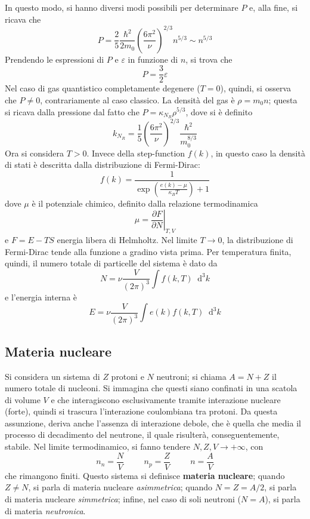 \documentclass[11pt, a4paper]{scrartcl}
\theoremstyle{style}
\newcommand{\dd}{\mathop{}\!\mathrm{d}}
\newcommand*\Eval[3]{\left.#1\right\rvert_{#2}^{#3}}
\numberwithin{equation}{subsection}
\begin{document}
In questo modo, si hanno diversi modi possibili per determinare $P$ e, alla fine, si ricava che
\begin{equation}
	P = \frac{2}{5} \frac{\hbar ^2}{2m_0} \left(\frac{6 \pi ^2}{\nu }\right) ^{2 / 3} n^{5 / 3} \sim n^{5 / 3}
\end{equation}
Prendendo le espressioni di $P$ e $\varepsilon $ in funzione di $n$, si trova che 
\[
P = \frac{3}{2} \varepsilon 
\] 
Nel caso di gas quantistico completamente degenere ($T=0$), quindi, si osserva che $P \neq 0$, contrariamente al caso classico.
La densit\`a del gas \`e $\rho  = m_0n$; questa si ricava dalla pressione dal fatto che $P = \kappa _{N_R}\rho ^{5 / 3}$, dove si \`e definito
\[
k_{N_R} = \frac{1}{5} \left(\frac{6\pi^2}{\nu }\right) ^{ 2 / 3} \frac{\hbar ^2}{m_0^{8 / 3}}
\] 
Ora si considera $T>0$.
Invece della step-function $f(k)$, in questo caso la densit\`a di stati \`e descritta dalla distribuzione di Fermi-Dirac: 
\[
f(k) = \frac{1}{\exp\left(\frac{e(k) - \mu }{\kappa _BT}\right) +1}
\] 
dove $\mu $ \`e il potenziale chimico, definito dalla relazione termodinamica
\[
	\mu  = \Eval{\frac{\partial F}{\partial N}}{T,V}{} 
\] 
e $F= E - TS$ energia libera di Helmholtz.
Nel limite $T\to 0$, la distribuzione di Fermi-Dirac tende alla funzione a gradino vista prima.
Per temperatura finita, quindi, il numero totale di particelle del sistema \`e dato da 
\[
N = \nu  \frac{V}{(2\pi)^3} \int f(k,T) \dd ^3 k
\] 
e l'energia interna \`e 
\[
E = \nu  \frac{V}{(2\pi)^3} \int e(k) f(k,T) \dd ^3 k 
\] 

\subsection{Materia nucleare}

Si considera un sistema di $Z$ protoni e $N$ neutroni; si chiama $A = N + Z$ il numero totale di nucleoni.
Si immagina che questi siano confinati in una scatola di volume $V$ e che interagiscono esclusivamente tramite interazione nucleare (forte), quindi si trascura l'interazione coulombiana tra protoni.
Da questa assunzione, deriva anche l'assenza di interazione debole, che \`e quella che media il processo di decadimento del neutrone, il quale risulter\`a, conseguentemente, stabile.
Nel limite termodinamico, si fanno tendere $N,Z,V\to +\infty$, con 
\[
n_n = \frac{N}{V} \hspace{1cm} n_p = \frac{Z}{V} \hspace{1cm} n = \frac{A}{V}
\] 
che rimangono finiti.
Questo sistema si definisce \textbf{materia nucleare}; quando $Z\neq N$, si parla di materia nucleare \textit{asimmetrica}; quando $N = Z = A / 2$, si parla di materia nucleare \textit{simmetrica}; infine, nel caso di soli neutroni ($N = A$), si parla di materia \textit{neutronica}.
\end{document}
